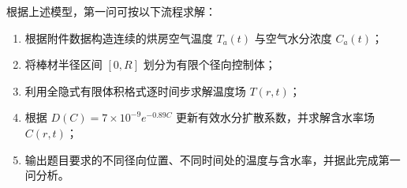 \documentclass[UTF8,a4paper,12pt]{ctexart}
\begin{document}
根据上述模型，第一问可按以下流程求解：
\begin{enumerate}
    \item 根据附件数据构造连续的烘房空气温度 $T_a(t)$ 与空气水分浓度 $C_a(t)$；
    \item 将棒材半径区间 $[0,R]$ 划分为有限个径向控制体；
    \item 利用全隐式有限体积格式逐时间步求解温度场 $T(r,t)$；
    \item 根据 $D(C)=7\times10^{-9}e^{-0.89C}$ 更新有效水分扩散系数，并求解含水率场 $C(r,t)$；
    \item 输出题目要求的不同径向位置、不同时间处的温度与含水率，并据此完成第一问分析。
\end{enumerate}

\end{document}
